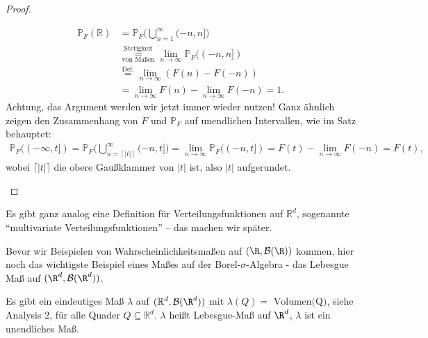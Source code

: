 \begin{proof}
\begin{enumerate}[label=(\roman*)]
		\begin{align*}
			\mathbb{P}_F(\mathbb{R}) &= \mathbb{P}_F\Big(\bigcup\limits_{n = 1}^{\infty} (-n,n]\Big)\\
			& \overset{\text{Stetigkeit}}{\underset{\text{von Maßen}}{=}} \lim\limits_{n \to \infty} \mathbb{P}_F((-n,n])\\
			&\overset{\text{Def.}}{=} \lim\limits_{n \to \infty} (F(n) - F(-n))\\
			& = \lim\limits_{n \to \infty} F(n) - \lim\limits_{n \to \infty} F(-n)=1.
		\end{align*}
		Achtung, das Argument werden wir jetzt immer wieder nutzen! Ganz \"ahnlich zeigen den Zusammenhang von $F$ und $\mathbb P_F$ auf unendlichen Intervallen, wie im Satz behauptet:
		\begin{gather*}
			\mathbb{P}_F((-\infty,t]) = \mathbb{P}_F\Big(\bigcup\limits_{n = \left \lceil{|t|}\right \rceil }^{\infty} (-n,t]\Big) = \lim\limits_{n \to \infty} \mathbb{P}_F((-n,t])=F(t)-\lim_{n\to\infty} F(-n)=F(t),
		\end{gather*}
		wobei $\lceil |t|\rceil$ die obere Gau\ss klammer von $|t|$ ist, also $|t|$ aufgerundet.
	\end{enumerate}
\end{proof}

\begin{bem}
	Es gibt ganz analog eine Definition für Verteilungsfunktionen auf $\mathbb{R}^d$, sogenannte \enquote{multivariate Verteilungsfunktionen} -- das machen wir später.
\end{bem}
Bevor wir Beispielen von Wahrscheinlichkeitsma\ss en auf $(\R,\mathcal B(\R))$ kommen, hier noch das wichtigste Beispiel eines Ma\ss es auf der Borel-$\sigma$-Algebra - das Lebesgue Ma\ss{} auf $(\R^d, \mathcal B(\R^d))$.
\begin{satz}
	Es gibt ein eindeutiges Maß $\lambda$ auf $(\mathbb{R}^d,\mathcal B(\R^d))$ mit $\lambda(Q) = \text{ Volumen(Q)}$, siehe Analysis 2, für alle Quader $Q \subseteq \mathbb{R}^d$. $\lambda$ heißt Lebesgue-Maß auf $\R^d$, $\lambda$ ist ein unendliches Ma\ss.
\end{satz}

